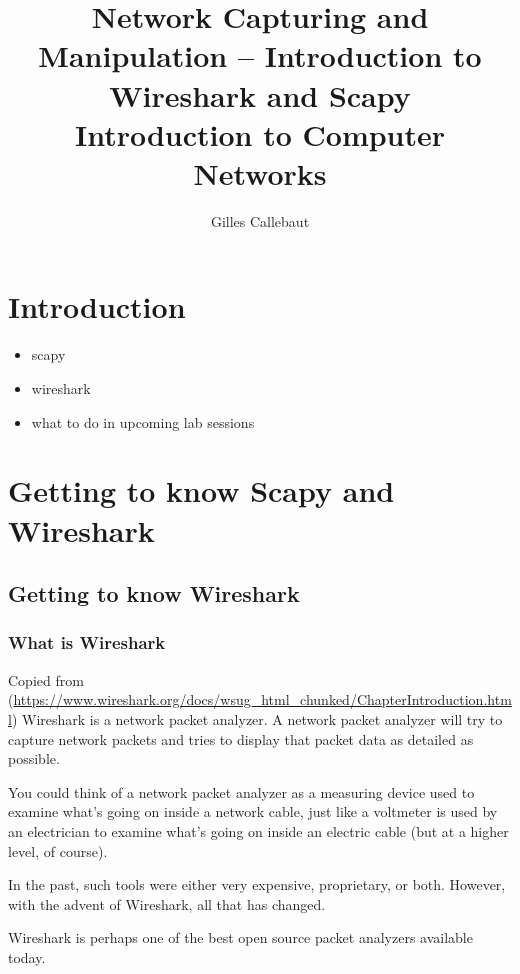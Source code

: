 \documentclass[11pt,a4paper]{article}
\title{Network Capturing and Manipulation -- Introduction to Wireshark and Scapy\\{\Large Introduction to Computer Networks}}
\author{Gilles Callebaut}
\begin{document}
 \sloppy

\maketitle

\section{Introduction}

\begin{itemize}
    \item scapy
    \item wireshark
    \item what to do in upcoming lab sessions
\end{itemize}

\section{Getting to know Scapy and Wireshark}

\subsection{Getting to know Wireshark}

\subsubsection{What is Wireshark}

Copied from (\url{https://www.wireshark.org/docs/wsug_html_chunked/ChapterIntroduction.html})
Wireshark is a network packet analyzer. A network packet analyzer will try to capture network packets and tries to display that packet data as detailed as possible.

You could think of a network packet analyzer as a measuring device used to examine what’s going on inside a network cable, just like a voltmeter is used by an electrician to examine what’s going on inside an electric cable (but at a higher level, of course).

In the past, such tools were either very expensive, proprietary, or both. However, with the advent of Wireshark, all that has changed.

Wireshark is perhaps one of the best open source packet analyzers available today.
\end{document}
